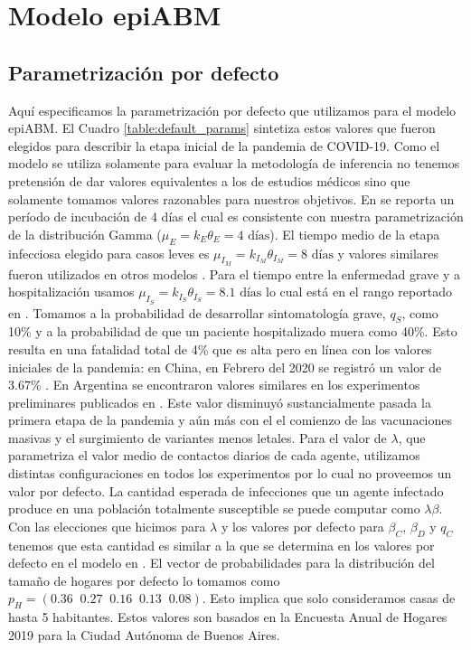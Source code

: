 \chapter{Modelo epiABM}
\section{Parametrización por defecto}\label{appendix:epi_abm_default_params}

Aquí especificamos la parametrización por defecto que utilizamos para el modelo epiABM. El Cuadro \ref{table:default_params} sintetiza estos valores que fueron elegidos para describir la etapa inicial de la pandemia de COVID-19. Como el modelo se utiliza solamente para evaluar la metodología de inferencia no tenemos pretensión de dar valores equivalentes a los de estudios médicos sino que solamente tomamos valores razonables para nuestros objetivos. En \cite{Guan2020} se reporta un período de incubación de 4 días el cual es consistente con nuestra parametrización de la distribución Gamma ($\mu_E = k_E \theta_E = 4\text{ días}$). El tiempo medio de la etapa infecciosa elegido para casos leves es $\mu_{I_M} = k_{I_M} \theta_{I_M} = 8 \text{ días}$ y valores similares fueron utilizados en otros modelos \citep{Zhao2020, Ivorra2020}. Para el tiempo entre la enfermedad grave y a hospitalización usamos $\mu_{I_S} = k_{I_S} \theta_{I_S} = 8.1 \text{ días}$ lo cual está en el rango reportado en \cite{Faes2020}. Tomamos a la probabilidad de desarrollar sintomatología grave, $q_S$, como 10\% y a la probabilidad de que un paciente hospitalizado muera como 40\%. Esto resulta en una fatalidad total de 4\% que es alta pero en línea con los valores iniciales de la pandemia: en China, en Febrero del 2020 se registró un valor de 3.67\% \citep{Verity2020}. En Argentina se encontraron valores similares en los experimentos preliminares publicados en \cite{Evensen2020}. Este valor disminuyó sustancialmente pasada la primera etapa de la pandemia y aún más con el el comienzo de las vacunaciones masivas y el surgimiento de variantes menos letales. Para el valor de $\lambda$, que parametriza el valor medio de contactos diarios de cada agente, utilizamos distintas configuraciones en todos los experimentos por lo cual no proveemos un valor por defecto. La cantidad esperada de infecciones que un agente infectado produce en una población totalmente susceptible se puede computar como $\lambda \beta$. Con las elecciones que hicimos para $\lambda$ y los valores por defecto para $\beta_C$, $\beta_D$ y $q_C$ tenemos que esta cantidad es similar a la que se determina en los valores por defecto en el modelo en \cite{Kerr2020}. El vector de probabilidades para la distribución del tamaño de hogares por defecto lo tomamos como $p_H = (0.36\;\; 0.27\;\; 0.16\;\; 0.13\;\; 0.08)$. Esto implica que solo consideramos casas de hasta 5 habitantes. Estos valores son basados en la Encuesta Anual de Hogares 2019 para la Ciudad Autónoma de Buenos Aires.

